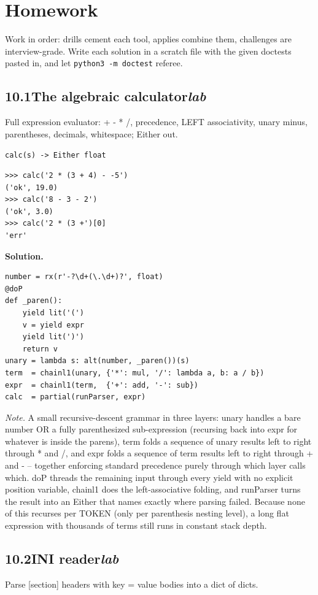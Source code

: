 \documentclass[10pt,letterpaper]{book}
\begin{document}
\section{Homework}
Work in order: drills cement each tool, applies combine them,
challenges are interview-grade. Write each solution in a scratch file with
the given doctests pasted in, and let \texttt{python3 -m doctest} referee.
\subsection*{10.1\quad The algebraic calculator\hfill\textnormal{\textit{lab}}}
Full expression evaluator: + - * /, precedence, LEFT associativity, unary minus, parentheses, decimals, whitespace; Either out.

\noindent\texttt{calc(s) -> Either float}
\begin{lstlisting}[style=ex]
>>> calc('2 * (3 + 4) - -5')
('ok', 19.0)
>>> calc('8 - 3 - 2')
('ok', 3.0)
>>> calc('2 * (3 +')[0]
'err'
\end{lstlisting}
\noindent\textbf{Solution.}
\begin{lstlisting}[style=code]
number = rx(r'-?\d+(\.\d+)?', float)
@doP
def _paren():
    yield lit('(')
    v = yield expr
    yield lit(')')
    return v
unary = lambda s: alt(number, _paren())(s)
term  = chainl1(unary, {'*': mul, '/': lambda a, b: a / b})
expr  = chainl1(term,  {'+': add, '-': sub})
calc  = partial(runParser, expr)
\end{lstlisting}
\noindent\textit{Note.} A small recursive-descent grammar in three layers: unary handles a bare number OR a fully parenthesized sub-expression (recursing back into expr for whatever is inside the parens), term folds a sequence of unary results left to right through * and /, and expr folds a sequence of term results left to right through + and - -- together enforcing standard precedence purely through which layer calls which. doP threads the remaining input through every yield with no explicit position variable, chainl1 does the left-associative folding, and runParser turns the result into an Either that names exactly where parsing failed. Because none of this recurses per TOKEN (only per parenthesis nesting level), a long flat expression with thousands of terms still runs in constant stack depth.

\subsection*{10.2\quad INI reader\hfill\textnormal{\textit{lab}}}
Parse [section] headers with key = value bodies into a dict of dicts.
\end{document}
